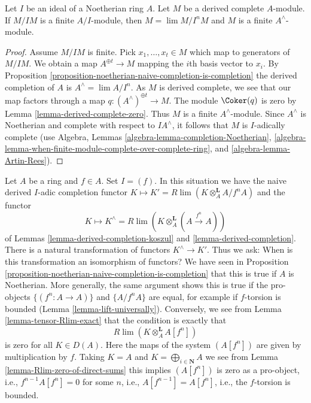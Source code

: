 \begin{lemma}
\label{lemma-derived-complete-finite}
Let $I$ be an ideal of a Noetherian ring $A$.
Let $M$ be a derived complete $A$-module.
If $M/IM$ is a finite $A/I$-module, then
$M = \lim M/I^nM$ and $M$ is a finite $A^\wedge$-module.
\end{lemma}

\begin{proof}
Assume $M/IM$ is finite. Pick $x_1, \ldots, x_t \in M$ which map to
generators of $M/IM$. We obtain a map $A^{\oplus t} \to M$ mapping
the $i$th basis vector to $x_i$. By
Proposition \ref{proposition-noetherian-naive-completion-is-completion}
the derived completion
of $A$ is $A^\wedge = \lim A/I^n$. As $M$ is derived complete, we
see that our map factors through a map $q : (A^\wedge)^{\oplus t} \to M$.
The module $\Coker(q)$ is zero by
Lemma \ref{lemma-derived-complete-zero}.
Thus $M$ is a finite $A^\wedge$-module.
Since $A^\wedge$ is Noetherian and complete with respect to $IA^\wedge$,
it follows that $M$ is $I$-adically complete (use
Algebra, Lemmas \ref{algebra-lemma-completion-Noetherian},
\ref{algebra-lemma-when-finite-module-complete-over-complete-ring}, and
\ref{algebra-lemma-Artin-Rees}).
\end{proof}

\begin{remark}
\label{remark-when-does-it-work}
Let $A$ be a ring and $f \in A$. Set $I = (f)$. In this situation
we have the naive derived $I$-adic completion functor
$K \mapsto K' = R\lim (K \otimes_A^\mathbf{L} A/f^nA)$ and the functor
$$
K \mapsto K^\wedge = R\lim (K \otimes_A^\mathbf{L} (A \xrightarrow{f^n} A))
$$
of Lemmas \ref{lemma-derived-completion-koszul} and
\ref{lemma-derived-completion}.
There is a natural transformation of functors $K^\wedge \to K'$.
Thus we ask: When is this transformation an isomorphism of functors?
We have seen in
Proposition \ref{proposition-noetherian-naive-completion-is-completion}
that this is true if $A$ is Noetherian. More generally, the same
argument shows this is true if the pro-objects
$\{(f^n : A \to A)\}$ and $\{A/f^nA\}$ are equal, for example
if $f$-torsion is bounded (Lemma \ref{lemma-lift-universally}).
Conversely, we see from Lemma \ref{lemma-tensor-Rlim-exact}
that the condition is exactly that
$$
R\lim (K \otimes_A^\mathbf{L} A[f^n])
$$
is zero for all $K \in D(A)$. Here the maps of the system $(A[f^n])$
are given by multiplication by $f$. Taking $K = A$ and
$K = \bigoplus_{i \in \mathbf{N}} A$ we see from
Lemma \ref{lemma-Rlim-zero-of-direct-sums}
this implies $(A[f^n])$ is zero as a pro-object, i.e.,
$f^{n - 1}A[f^n] = 0$ for some $n$, i.e., $A[f^{n - 1}] = A[f^n]$, i.e.,
the $f$-torsion is bounded.
\end{remark}

